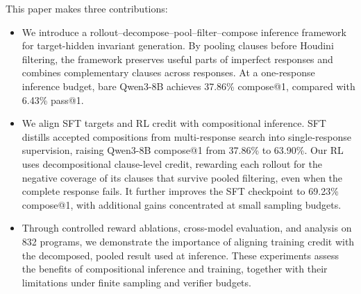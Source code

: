 

\begin{samepage}
This paper makes three contributions:
\begin{itemize}
  \item We introduce a rollout--decompose--pool--filter--compose inference
  framework for target-hidden invariant generation.  By pooling clauses
  before Houdini filtering, the framework preserves useful parts of imperfect
  responses and combines complementary clauses across responses.  At a
  one-response inference budget, bare Qwen3-8B achieves 37.86\% compose@1,
  compared with 6.43\% pass@1.
  \item We align SFT targets and RL credit with compositional inference.
  SFT distills accepted compositions from multi-response search into
  single-response supervision, raising Qwen3-8B compose@1 from 37.86\% to
  63.90\%.  Our RL uses decompositional clause-level credit, rewarding
  each rollout for the negative coverage of its clauses that survive pooled
  filtering, even when the complete response fails.  It further improves the
  SFT checkpoint to 69.23\% compose@1, with additional gains concentrated at
  small sampling budgets.
  \item Through controlled reward ablations, cross-model evaluation, and
  analysis on 832 programs, we demonstrate the importance of aligning
  training credit with the decomposed, pooled result used at inference.
  These experiments assess the benefits of compositional inference and
  training, together with their limitations under finite sampling and
  verifier budgets.
\end{itemize}
\end{samepage}
